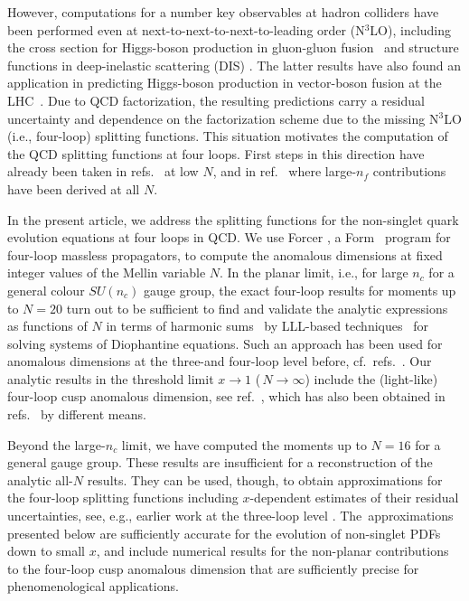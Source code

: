 \documentclass[12pt]{article}
\def\nc{{n_c}}
\begin{document}
However, computations for a number key observables at hadron colliders have 
been performed even at next-to-next-to-next-to-leading order (N$^3$LO), 
including the cross section for Higgs-boson production in gluon-gluon 
fusion~\cite{Anastasiou:2015ema} and structure functions in deep-inelastic 
scattering (DIS) \cite{Vermaseren:2005qc,Moch:2008fj,Davies:2016ruz,DMVVprep}. 
The latter results have also found an application in predicting Higgs-boson 
production in vector-boson fusion at the LHC~\cite{Dreyer:2016oyx}.
Due to QCD factorization, the resulting predictions carry a residual 
uncertainty and dependence on the factorization scheme due to the missing 
N$^3$LO (i.e., four-loop) splitting functions.
This situation motivates the computation of the QCD splitting functions at
four loops. First steps in this direction have already been taken in 
refs.~\cite{Baikov:2006ai,Velizhanin:2011es,Velizhanin:2014fua,Baikov:2015tea,%
Ruijl:2016pkm} at low $N$, and in ref.~\cite{Davies:2016jie} where large-$n_f$ 
contributions have been derived at all $N$.

In the present article, we address the splitting functions for the non-singlet 
quark evolution equations at four loops in QCD.  We use {\sc Forcer} 
\cite{Ruijl:2017cxj}, 
a {\sc Form}~\cite{Vermaseren:2000nd,Kuipers:2012rf,Tentyukov:2007mu} 
program for four-loop massless propagators, to compute the anomalous dimensions
at fixed integer values of the Mellin variable $N$.
In the planar limit, i.e., for large $\nc$ for a general colour $SU(\nc)$ gauge 
group, the exact four-loop results for moments up to $N = 20$ turn out to be
 sufficient to find and validate the analytic expressions as functions of $N$ 
in terms of harmonic sums~\cite{Vermaseren:1998uu,Blumlein:1998if} by LLL-based 
techniques~\cite{Lenstra1982,axbAlg,DBLP:journals/dcc/Silverman00,Calc} 
for solving systems of Diophantine equations.
Such an approach has been used for anomalous dimensions at the three-and 
four-loop level before, 
cf.~refs.~\cite{Velizhanin:2012nm,Moch:2014sna,Davies:2016jie}.
Our analytic results in the threshold limit $x \to 1$ ($\,N \to \infty$)
include the (light-like) four-loop cusp anomalous dimension, 
see ref.~\cite{Korchemsky:1988si}, which has also been obtained in 
refs.~\cite{Henn:2016men,Lee:2016ixa} by different means.

Beyond the large-$\nc$ limit, we have computed the moments up to $N = 16$ 
for a general gauge group. These results are insufficient for a reconstruction 
of the analytic all-$N$ results. They can be used, though, to obtain 
approximations for the four-loop splitting functions including $x$-dependent 
estimates of their residual uncertainties, see, e.g., earlier work at the 
three-loop level \cite{vanNeerven:1999ca,vanNeerven:2000uj,vanNeerven:2000wp}. 
The~approximations presented below are sufficiently accurate for the evolution
of non-singlet PDFs down to small $x$, and include numerical results for the 
non-planar contributions to the four-loop cusp anomalous dimension that are 
sufficiently precise for phenomenological applications.
\end{document}
